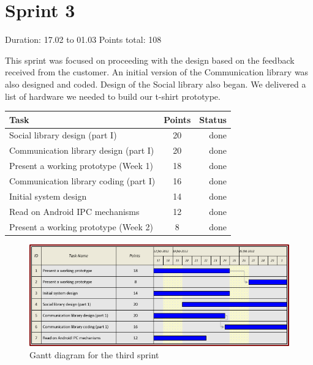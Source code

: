 \section{Sprint 3}

Duration: 17.02 to 01.03
Points total: 108

This sprint was focused on proceeding with the design based on the
feedback received from the customer. An initial version of the Communication
library was also designed and coded. Design of the Social library also began.
We delivered a list of hardware we needed to build our t-shirt prototype.

\begin{table}[ht!]
\begin{tabular}{ | l | c | r | }

\hline
\textbf{Task} & \textbf{Points} & \textbf{Status} \\
\hline

Social library design (part I)          & 20 & done \\
\hline
Communication library design (part I)       & 20 & done \\
\hline
Present a working prototype (Week 1)		& 18 & done \\
\hline
Communication library coding (part I)       & 16 & done \\
\hline
Initial system design               & 14 & done \\
\hline
Read on Android IPC mechanisms			& 12 & done \\
\hline
Present a working prototype (Week 2)        & 8  & done \\
\hline

\end{tabular}
\end{table}

\begin{figure}[h!]
\centering \includegraphics[scale=0.8]{img/sprints-gantt3.png}
\caption{Gantt diagram for the third sprint}
\label{fig:sprints-gantt3}
\end{figure}

